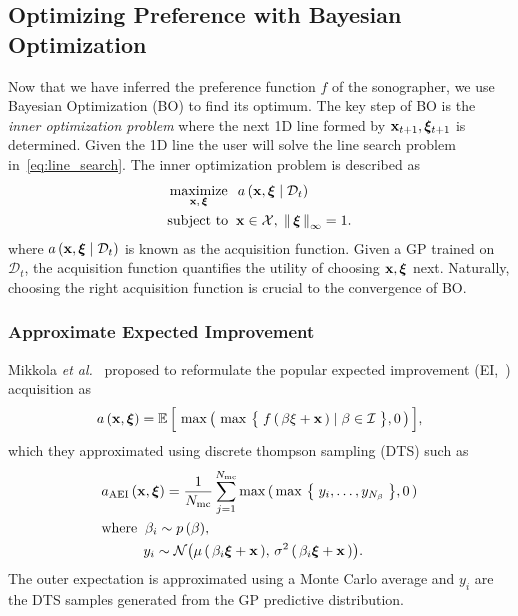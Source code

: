 \subsection{Optimizing Preference with Bayesian Optimization}\label{section:bo}
Now that we have inferred the preference function \(f\) of the sonographer, we use Bayesian Optimization (BO) to find its optimum.
The key step of BO is the \textit{inner optimization problem} where the next 1D line formed by \(\mathbf{x}_{t+1}, \bm{\xi}_{t+1}\) is determined.
Given the 1D line the user will solve the line search problem in~\cref{eq:line_search}.
The inner optimization problem is described as
%
\begin{align}
 &\operatorname*{maximize}_{\mathbf{x},\, \bm{\xi}}\;\; a\,(\mathbf{x}, \bm{\xi} \mid \mathcal{D}_t) \\
 &\text{subject to}\;\; \mathbf{x} \in \mathcal{X},\; \left\lVert\, \bm{\xi} \,\right\rVert_{\infty} = 1.
\end{align}
where \(a\,(\mathbf{x}, \bm{\xi} \mid \mathcal{D}_t)\) is known as the acquisition function.
Given a GP trained on \(\mathcal{D}_t\), the acquisition function quantifies the utility of choosing \(\mathbf{x}, \bm{\xi}\) next.
Naturally, choosing the right acquisition function is crucial to the convergence of BO.

\subsubsection{Approximate Expected Improvement}
Mikkola \textit{et al.}~\cite{10.1145/3072959.3073598} proposed to reformulate the popular expected improvement (EI,~\cite{jones_efficient_1998}) acquisition as
\begin{align}
  a\,(\mathbf{x}, \bm{\xi})
  = \mathbb{E}\,\Big[\, \max\big(\, \max\,\big\{\; f\,(\,\beta \xi + \mathbf{x}\,) \mid \beta \in \mathcal{I} \;\big\}, 0 \,\big)\,\Big],
\end{align}
which they approximated using discrete thompson sampling (DTS) such as
\begin{align}
  &a_{\mathrm{AEI}}\,(\mathbf{x}, \bm{\xi}) 
  = \frac{1}{N_{\mathrm{mc}}} \sum_{j=1}^{N_{\mathrm{mc}}} \max\,(\, \max\,\big\{\; y_i, \ldots, y_{N_\beta} \;\big\}, 0 \,) \label{eq:aei} \\
  &\text{where} \;\;  \beta_i \sim p\,(\beta), \nonumber\\
  &\quad\qquad y_i \sim \mathcal{N}\big( \mu\,(\,\beta_i \bm{\xi} + \mathbf{x} \,),\, \sigma^2\,(\, \beta_i \bm{\xi} + \mathbf{x} \,) \big).\nonumber
\end{align}
The outer expectation is approximated using a Monte Carlo average and \(y_i\) are the DTS samples generated from the GP predictive distribution.

